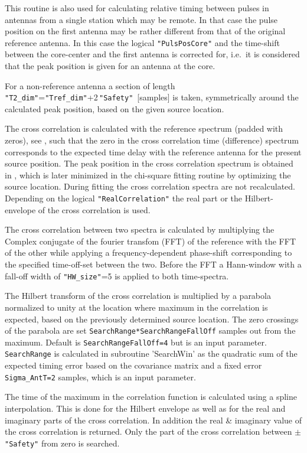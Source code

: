 This routine is also used for calculating relative timing between pulses in antennas from a single station which may be remote. In that case the pulse position on the first antenna may be rather different from that of the original reference antenna. In this case the logical \verb!"PulsPosCore"! and the time-shift between the core-center and the first antenna is corrected for, i.e.\ it is considered that the peak position is given for an antenna at the core.

For a non-reference antenna a section of length \verb!"T2_dim"!=\verb!"Tref_dim"!+2\,\verb!"Safety"!~[samples] is taken, symmetrically around the calculated peak position, based on the given source location.

The cross correlation is calculated with the reference spectrum (padded with zeros), see , such that the zero in the cross correlation time (difference) spectrum corresponds to the expected time delay with the reference antenna for the present source position. The peak position in the cross correlation spectrum is obtained in , which is later minimized in the chi-square fitting routine by optimizing the source location. During fitting the cross correlation spectra are not recalculated. Depending on the logical \verb!"RealCorrelation"! the real part or the Hilbert-envelope of the cross correlation is used.

The cross correlation between two spectra is calculated by multiplying the Complex conjugate of the fourier transfom (FFT) of the reference with the FFT of the other while applying a frequency-dependent phase-shift corresponding to the specified time-off-set between the two. Before the FFT a Hann-window with a fall-off width of \verb!"HW_size"!=5 is applied to both time-spectra.

The Hilbert transform of the cross correlation is multiplied by a parabola normalized to unity at the location where maximum in the correlation is expected, based on the previously determined source location. The zero crossings of the parabola are set \verb!SearchRange*SearchRangeFallOff! samples out from the maximum. Default is \verb!SearchRangeFallOff=4! but is an input parameter. \verb!SearchRange! is calculated in subroutine 'SearchWin' as the quadratic sum of the expected timing error based on the covariance matrix and a fixed error \verb!Sigma_AntT=2! samples, which is an input parameter.

The time of the maximum in the correlation function is calculated using a spline interpolation. This is done for the Hilbert envelope as well as for the real and imaginary parts of the cross correlation. In addition the real \& imaginary value of the cross correlation is returned.  Only the part of the cross correlation between $\pm$\verb!"Safety"! from zero is searched.

